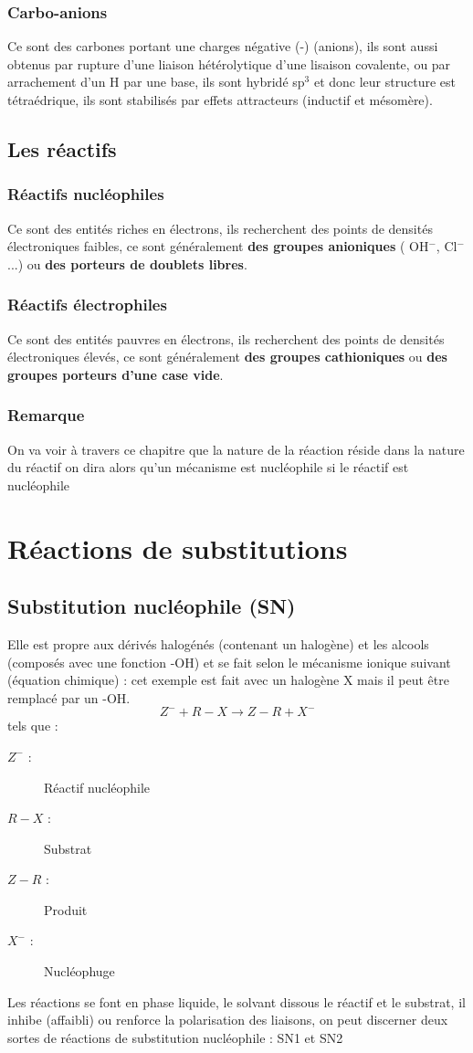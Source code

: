 \documentclass[a4paper, oneside]{book}
\begin{document}
\subsection{Carbo-anions}
Ce sont des carbones portant une charges négative (-) (anions), ils sont aussi obtenus par rupture d'une liaison hétérolytique d'une lisaison covalente, ou par arrachement d'un H par une base, ils sont hybridé sp$^3$ et donc leur structure est tétraédrique, ils sont stabilisés par effets attracteurs (inductif et mésomère).
\section{Les réactifs}
\subsection{Réactifs nucléophiles}
Ce sont des entités riches en électrons, ils recherchent des points de densités électroniques faibles, ce sont généralement \textbf{des groupes anioniques} ( OH$^-$, Cl$^-$ ...) ou \textbf{des porteurs de doublets libres}.
\subsection{Réactifs électrophiles}
Ce sont des entités pauvres en électrons, ils recherchent des points de densités électroniques élevés, ce sont généralement \textbf{des groupes cathioniques} ou \textbf{des groupes porteurs d'une case vide}.
\subsection*{Remarque}
On va voir à travers ce chapitre que la nature de la réaction réside dans la nature du réactif on dira alors qu'un mécanisme est nucléophile si le réactif est nucléophile
\chapter{Réactions de substitutions}
\minitoc
\section{Substitution nucléophile (SN)}
Elle est propre aux dérivés halogénés (contenant un halogène) et les alcools (composés avec une fonction -OH) et se fait selon le mécanisme ionique suivant (équation chimique) : cet exemple est fait avec un halogène X mais il peut être remplacé par un -OH.
\[
    Z^- + R-X \longrightarrow Z-R + X^-
\]
tels que :
\begin{description}
    \item[$ Z^-$ :] Réactif nucléophile
    \item[$R-X$ :] Substrat
    \item[$Z-R$ :] Produit
    \item[$X^-$ :] Nucléophuge
\end{description}
Les réactions se font en phase liquide, le solvant dissous le réactif et le substrat, il inhibe (affaibli) ou renforce la polarisation des liaisons, on peut discerner deux sortes de réactions de substitution nucléophile : SN1 et SN2
\end{document}

